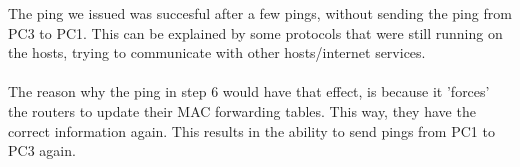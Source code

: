 The ping we issued was succesful after a few pings, without sending the ping from PC3 to PC1. This can be explained by some protocols that were still running on the hosts, trying to communicate with other hosts/internet services.
\\ \\
The reason why the ping in step 6 would have that effect, is because it 'forces' the routers to update their MAC forwarding tables. This way, they have the correct information again. This results in the ability to send pings from PC1 to PC3 again.
